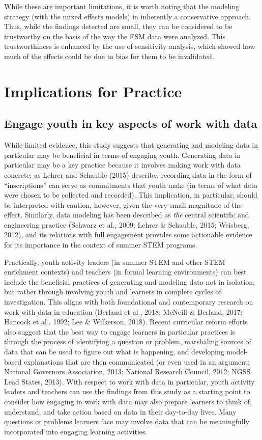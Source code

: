\documentclass[]{book}
\theoremstyle{definition}
\theoremstyle{definition}
\theoremstyle{definition}
\theoremstyle{remark}
\begin{document}
While these are important limitations, it is worth noting that the
modeling strategy (with the mixed effects models) in inherently a
conservative approach. Thus, while the findings detected are small, they
can be considered to be trustworthy on the basis of the way the ESM data
were analyzed. This trustworthiness is enhanced by the use of
sensitivity analysis, which showed how much of the effects could be due
to bias for them to be invalidated.

\section{Implications for Practice}\label{implications-for-practice}

\subsection{Engage youth in key aspects of work with
data}\label{engage-youth-in-key-aspects-of-work-with-data}

While limited evidence, this study suggests that generating and modeling
data in particular may be beneficial in terms of engaging youth.
Generating data in particular may be a key practice because it involves
making work with data concrete; as Lehrer and Schauble (2015) describe,
recording data in the form of ``inscriptions'' can serve as commitments
that youth make (in terms of what data were chosen to be collected and
recorded). This implication, in particular, should be interpreted with
caution, however, given the very small magnitude of the effect.
Similarly, data modeling has been described as \emph{the} central
scientific and engineering practice (Schwarz et al., 2009; Lehrer \&
Schauble, 2015; Weisberg, 2012), and its relations with full engagement
provides some actionable evidence for its importance in the context of
summer STEM programs.

Practically, youth activity leaders (in summer STEM and other STEM
enrichment contexts) and teachers (in formal learning environments) can
best include the beneficial practices of generating and modeling data
not in isolation, but rather through involving youth and learners in
complete cycles of investigation. This aligns with both foundational and
contemporary research on work with data in education (Berland et al.,
2018; McNeill \& Berland, 2017; Hancock et al., 1992; Lee \& Wilkerson,
2018). Recent curricular reform efforts also suggest that the best way
to engage learners in particular practices is through the process of
identifying a question or problem, marshaling sources of data that can
be used to figure out what is happening, and developing model-based
explanations that are then communicated (or even used in an argument;
National Governors Association, 2013; National Research Council, 2012;
NGSS Lead States, 2013). With respect to work with data in particular,
youth activity leaders and teachers can use the findings from this study
as a starting point to consider how engaging in work with data may also
prepare learners to think of, understand, and take action based on data
in their day-to-day lives. Many questions or problems learners face may
involve data that can be meaningfully incorporated into engaging
learning activities.
\end{document}
